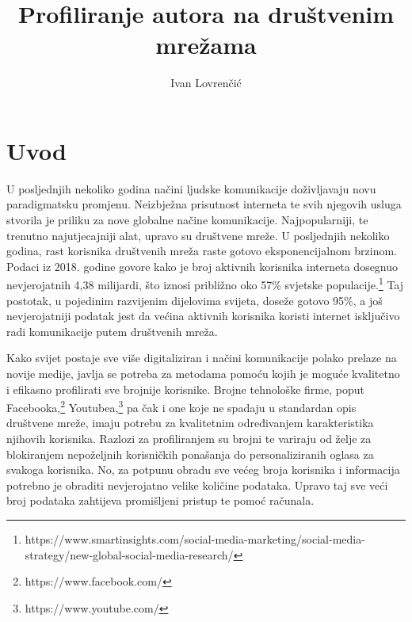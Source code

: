 \documentclass[times, utf8, zavrsni]{fer}
\begin{document}

\title{Profiliranje autora na društvenim mrežama}

\author{Ivan Lovrenčić}

\maketitle

\izvornik

\zahvala{}

\tableofcontents


\chapter{Uvod}


\indent U posljednjih nekoliko godina načini ljudske komunikacije doživljavaju novu paradigmatsku promjenu. Neizbježna prisutnost interneta te svih njegovih usluga stvorila je priliku za nove globalne načine komunikacije. Najpopularniji, te trenutno najutjecajniji alat, upravo su društvene mreže. U posljednjih nekoliko godina, rast korisnika društvenih mreža raste gotovo eksponencijalnom brzinom. Podaci iz 2018. godine govore kako je broj aktivnih korisnika interneta dosegnuo nevjerojatnih 4,38 milijardi, što iznosi približno oko 57\% svjetske populacije.\footnote{https://www.smartinsights.com/social-media-marketing/social-media-strategy/new-global-social-media-research/} Taj postotak, u pojedinim razvijenim dijelovima svijeta, doseže gotovo 95\%, a još nevjerojatniji podatak jest da većina aktivnih korisnika koristi internet isključivo radi komunikacije putem društvenih mreža.

Kako svijet postaje sve više digitaliziran i načini komunikacije polako prelaze na novije medije, javlja se potreba za metodama pomoću kojih je moguće kvalitetno i efikasno profilirati sve brojnije korisnike. Brojne tehnološke firme, poput Facebooka,\footnote{https://www.facebook.com/} Youtubea,\footnote{https://www.youtube.com/} pa čak i one koje ne spadaju u standardan opis društvene mreže, imaju potrebu za kvalitetnim određivanjem karakteristika njihovih korisnika. Razlozi za profiliranjem su brojni te variraju od želje za blokiranjem nepoželjnih korisničkih ponašanja do personaliziranih oglasa za svakoga korisnika. No, za potpunu obradu sve većeg broja korisnika i informacija potrebno je obraditi nevjerojatno velike količine podataka. Upravo taj sve veći broj podataka zahtijeva promišljeni pristup te pomoć računala.
\end{document}
